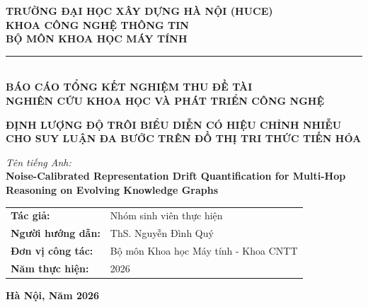 \documentclass[12pt,a4paper,oneside]{report}
\theoremstyle{definition}
\theoremstyle{plain}
\theoremstyle{remark}
\begin{document}
\begin{titlepage}
    \centering
    \begin{minipage}{0.9\textwidth}
        \centering
        \textbf{\large TRƯỜNG ĐẠI HỌC XÂY DỰNG HÀ NỘI (HUCE)}\\[0.2cm]
        \textbf{\large KHOA CÔNG NGHỆ THÔNG TIN}\\[0.1cm]
        \textbf{\large BỘ MÔN KHOA HỌC MÁY TÍNH}\\[0.3cm]
        \rule{0.8\textwidth}{1.2pt}\\[1.8cm]

        \textbf{\Large BÁO CÁO TỔNG KẾT NGHIỆM THU ĐỀ TÀI}\\[0.3cm]
        \textbf{\large NGHIÊN CỨU KHOA HỌC VÀ PHÁT TRIỂN CÔNG NGHỆ}\\[1.5cm]

        {\color{huceblue}\huge \bfseries ĐỊNH LƯỢNG ĐỘ TRÔI BIỂU DIỄN CÓ HIỆU CHỈNH NHIỄU CHO SUY LUẬN ĐA BƯỚC TRÊN ĐỒ THỊ TRI THỨC TIẾN HÓA\par}
        \vspace{0.8cm}

        {\large \textit{Tên tiếng Anh:}\\[0.15cm]
        \textbf{Noise-Calibrated Representation Drift Quantification for Multi-Hop Reasoning on Evolving Knowledge Graphs}\par}
        \vspace{1.8cm}
    \end{minipage}

    \vfill

    \begin{minipage}{0.95\textwidth}
        \large
        \begin{tabular}{@{}ll@{}}
            \textbf{Tác giả:} & Nhóm sinh viên thực hiện \\
            \textbf{Người hướng dẫn:} & ThS. Nguyễn Đình Quý \\
            \textbf{Đơn vị công tác:} & Bộ môn Khoa học Máy tính - Khoa CNTT \\
            \textbf{Năm thực hiện:} & 2026
        \end{tabular}
    \end{minipage}

    \vfill
    {\large \textbf{Hà Nội, Năm 2026}}
\end{titlepage}
\end{document}
